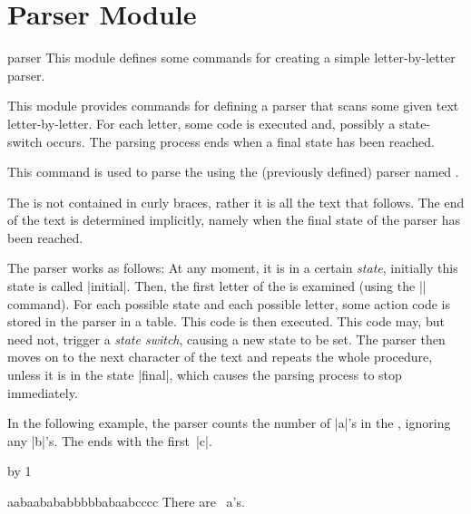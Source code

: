 %
%
%



\section{Parser Module}

\label{section-module-parser}

\begin{pgfmodule}{parser}
  This module defines some commands for creating a simple
  letter-by-letter parser.
\end{pgfmodule}

This module provides commands for defining a parser that scans some
given text letter-by-letter. For each letter, some code is executed
and, possibly a state-switch occurs. The parsing process ends when a
final state has been reached.

\begin{command}{\pgfparserparse{}}
  This command is used to parse the  using the (previously
  defined) parser named .

  The  is not contained in curly braces, rather it is all
  the text that follows. The end of the text is determined implicitly,
  namely when the final state of the parser has been reached.

  The parser works as follows: At any moment, it is in a certain
  \emph{state}, initially this state is called |initial|. Then, the
  first letter of the  is examined (using the |\futurlet|
  command). For each possible state and each possible letter, some
  action code is stored in the parser in a table. This code is then
  executed. This code may, but need not, trigger a \emph{state
    switch}, causing a new state to be set. The parser then moves on
  to the next character of the text and repeats the whole
  procedure, unless it is in the state |final|, which causes the
  parsing process to stop immediately.

  In the following example, the parser counts the number of |a|'s
  in the , ignoring any |b|'s. The  ends with
  the first~|c|.
\begin{codeexample}[]
\newcount\mycount
{}
{\advance\mycount by 1\relax}
{} %
{}%

aabaabababbbbbabaabcccc
There are \the\mycount\ a's.
\end{codeexample}
\end{command}

